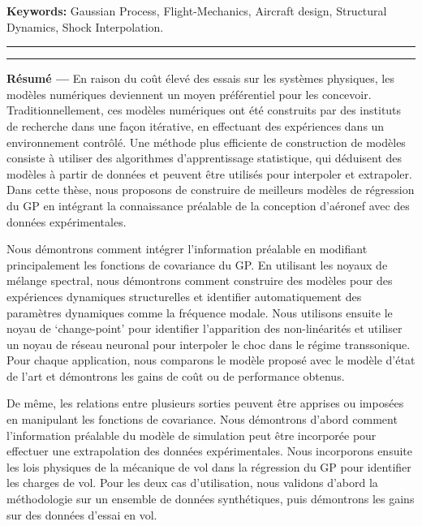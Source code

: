 {\large\textbf{Keywords:}}
    Gaussian Process, Flight-Mechanics, Aircraft design, Structural Dynamics, Shock Interpolation.
\\
\noindent\rule[2pt]{\textwidth}{0.5pt}

\pagebreak

\noindent\rule[2pt]{\textwidth}{0.5pt}

{\large\textbf{Résumé ---}}
En raison du coût élevé des essais sur les systèmes physiques, les modèles numériques deviennent un moyen préférentiel pour les concevoir. Traditionnellement, ces modèles numériques ont été construits par des instituts de recherche dans une façon itérative, en effectuant des expériences dans un environnement contrôlé. Une méthode plus efficiente de construction de modèles consiste à utiliser des algorithmes d'apprentissage statistique, qui déduisent des modèles à partir de données et peuvent être utilisés pour interpoler et extrapoler. Dans cette thèse, nous proposons de construire de meilleurs modèles de régression du GP en intégrant la connaissance préalable de la conception d'aéronef avec des données expérimentales.

Nous démontrons comment intégrer l'information préalable en modifiant principalement les fonctions de covariance du GP. En utilisant les noyaux de mélange spectral, nous démontrons comment construire des modèles pour des expériences dynamiques structurelles et identifier automatiquement des paramètres dynamiques comme la fréquence modale. Nous utilisons ensuite le noyau de `change-point' pour identifier l'apparition des non-linéarités et utiliser un noyau de réseau neuronal pour interpoler le choc dans le régime transsonique. Pour chaque application, nous comparons le modèle proposé avec le modèle d'état de l'art et démontrons les gains de coût ou de performance obtenus.


De même, les relations entre plusieurs sorties peuvent être apprises ou imposées en manipulant les fonctions de covariance. Nous démontrons d'abord comment l'information préalable du modèle de simulation peut être incorporée pour effectuer une extrapolation des données expérimentales. Nous incorporons ensuite les lois physiques de la mécanique de vol dans la régression du GP pour identifier les charges de vol. Pour les deux cas d'utilisation, nous validons d'abord la méthodologie sur un ensemble de données synthétiques, puis démontrons les gains sur des données d'essai en vol.

